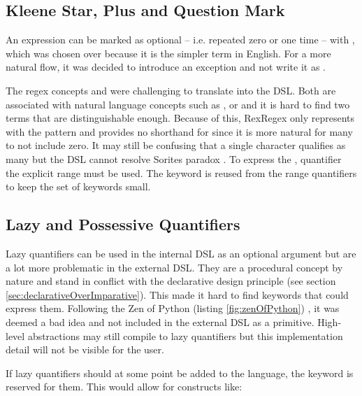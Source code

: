 \subsection{Kleene Star, Plus and Question Mark}

An expression can be marked as optional -- i.e. repeated zero or one time -- with , which was chosen over  because it is the simpler term in English. For a more natural flow, it was decided to introduce an exception and not write it as .

The regex concepts \pattern{\placeholder *} and \pattern{\placeholder +} were challenging to translate into the DSL. Both are associated with natural language concepts such as ,  or  and it is hard to find two terms that are distinguishable enough. Because of this, RexRegex only represents \pattern{+} with the  pattern and provides no shorthand for \pattern{*} since it is more natural for many to not include zero. It may still be confusing that a single character qualifies as many but the DSL cannot resolve Sorites paradox \cite{SoritesParadox}. To express the \pattern{*}, quantifier the explicit range  must be used. The  keyword is reused from the range quantifiers to keep the set of keywords small.

\subsection{Lazy and Possessive Quantifiers}

Lazy quantifiers can be used in the internal DSL as an optional argument  but are a lot more problematic in the external DSL. They are a procedural concept by nature and stand in conflict with the declarative design principle (see section \ref{sec:declarativeOverImparative}). This made it hard to find keywords that could express them. Following the Zen of Python (listing \ref{fig:zenOfPython}) , it was deemed a bad idea and not included in the external DSL as a primitive. High-level abstractions may still compile to lazy quantifiers but this implementation detail will not be visible for the user.

If lazy quantifiers should at some point be added to the language, the  keyword is reserved for them. This would allow for constructs like: 

